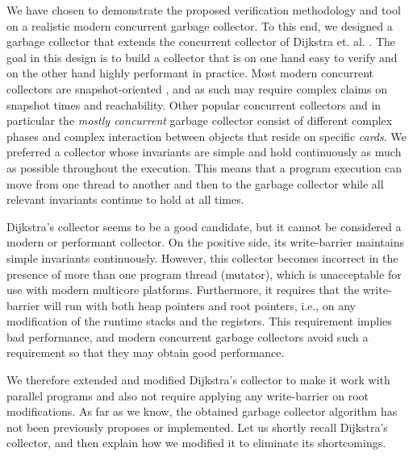 We have chosen to demonstrate the proposed verification methodology and tool on a realistic modern concurrent garbage collector. To this end, we designed a garbage collector that extends the concurrent collector of Dijkstra et. al. \cite{dijk78}. The goal in this design is to build a collector that is on one hand easy to verify and on the other hand highly performant in practice. Most modern concurrent collectors are snapshot-oriented  \cite{doli93,doli94,doma00,azat03}, and as such may require complex claims on snapshot times and reachability. Other popular concurrent collectors and in particular the {\em mostly concurrent} garbage collector \cite{boeh91,prin00a,bara05} consist of different complex phases and complex interaction between objects that reside on specific {\em cards}. We preferred a collector whose invariants are simple and hold continuously as much as possible throughout the execution. This means that a program execution can move from one thread to another and then to the garbage collector while all relevant invariants continue to hold at all times. 

Dijkstra's collector seems to be a good candidate, but it cannot be considered a modern or performant collector. On the positive side, its write-barrier maintains simple invariants continuously. However, this collector becomes incorrect in the presence of more than one program thread (mutator), which is unacceptable for use with modern multicore platforms. Furthermore, it requires that the write-barrier will run with both heap pointers and root pointers, i.e., on any modification of the runtime stacks and the registers. This requirement implies bad performance, and modern concurrent garbage collectors avoid such a requirement so that they may obtain good performance. 

We therefore extended and modified Dijkstra's collector to make it work with parallel programs and also not require applying any write-barrier on root modifications. As far as we know, the obtained garbage collector algorithm has not been previously proposes or implemented. Let us shortly recall Dijkstra's collector, and then explain how we modified it to eliminate its shortcomings.  

